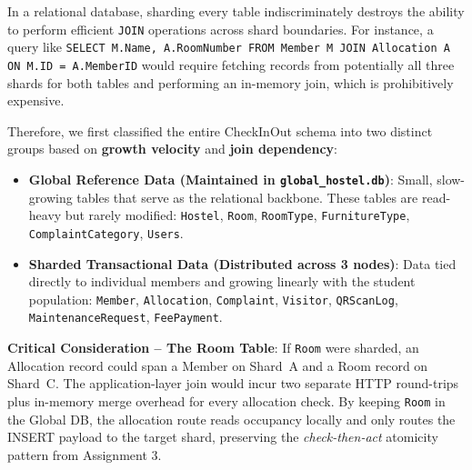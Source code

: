 \documentclass[sigconf]{acmart}
\begin{document}
In a relational database, sharding every table indiscriminately destroys the ability to perform efficient \texttt{JOIN} operations across shard boundaries. For instance, a query like \texttt{SELECT M.Name, A.RoomNumber FROM Member M JOIN Allocation A ON M.ID = A.MemberID} would require fetching records from potentially all three shards for both tables and performing an in-memory join, which is prohibitively expensive.

Therefore, we first classified the entire CheckInOut schema into two distinct groups based on \textbf{growth velocity} and \textbf{join dependency}:

\begin{itemize}[leftmargin=*]
    \item \textbf{Global Reference Data (Maintained in \texttt{global\_hostel.db})}: Small, slow-growing tables that serve as the relational backbone. These tables are read-heavy but rarely modified: \texttt{Hostel}, \texttt{Room}, \texttt{RoomType}, \texttt{FurnitureType}, \texttt{ComplaintCategory}, \texttt{Users}.
    \item \textbf{Sharded Transactional Data (Distributed across 3 nodes)}: Data tied directly to individual members and growing linearly with the student population: \texttt{Member}, \texttt{Allocation}, \texttt{Complaint}, \texttt{Visitor}, \texttt{QRScanLog}, \texttt{MaintenanceRequest}, \texttt{FeePayment}.
\end{itemize}

\textbf{Critical Consideration -- The Room Table}: If \texttt{Room} were sharded, an Allocation record could span a Member on Shard~A and a Room record on Shard~C. The application-layer join would incur two separate HTTP round-trips plus in-memory merge overhead for every allocation check. By keeping \texttt{Room} in the Global DB, the allocation route reads occupancy locally and only routes the INSERT payload to the target shard, preserving the \textit{check-then-act} atomicity pattern from Assignment 3.
\end{document}
